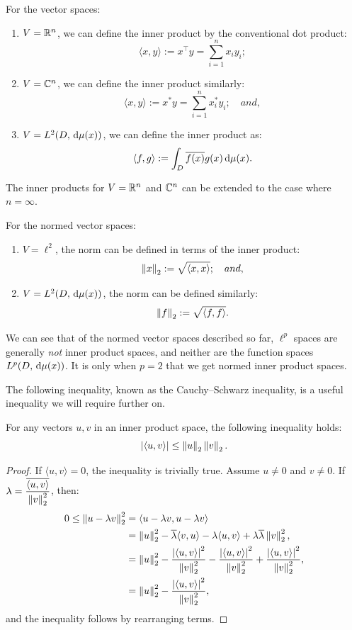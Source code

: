\begin{example}
For the vector spaces:
\begin{enumerate}
\item $V = \mathbb{R}^n$, we can define the inner product by the conventional dot product:
\[
\langle x,y \rangle := x^\top y = \sum_{i=1}^n x_iy_i;
\]
\item $V = \mathbb{C}^n$, we can define the inner product similarly:
\[
\langle x,y \rangle := x^* y = \sum_{i=1}^n x_i^*y_i;\quad and,
\]
\item $V = L^2(D,{\rm\,d}\mu(x))$, we can define the inner product as:
\[
\langle f,g\rangle := \int_D\overline{f(x)}g(x){\rm\,d}\mu(x).
\]
\end{enumerate}
\end{example}
The inner products for $V = \mathbb{R}^n$ and $\mathbb{C}^n$ can be extended to the case where $n=\infty$.

\begin{example} For the normed vector spaces:
\begin{enumerate}
\item $V = \ell^2$, the norm can be defined in terms of the inner product:
\[
\left\|{x}\right\|_2 := \sqrt{\langle x,x\rangle};\quad and,
\]
\item $V = L^2(D,{\rm\,d}\mu(x))$, the norm can be defined similarly:
\[
\left\|{f}\right\|_2 := \sqrt{\langle f,f\rangle}.
\]
\end{enumerate}
\end{example}

We can see that of the normed vector spaces described so far, $\ell^p$ spaces are generally {\em not} inner product spaces, and neither are the function spaces $L^p(D,{\rm\,d}\mu(x))$. It is only when $p=2$ that we get normed inner product spaces.

The following inequality, known as the Cauchy--Schwarz inequality, is a useful inequality we will require further on.
\begin{theorem}
For any vectors $u,v$ in an inner product space, the following inequality holds:
\begin{equation}
\left|{\langle u,v\rangle}\right| \le \left\|{u}\right\|_2\left\|{v}\right\|_2.
\end{equation}
\end{theorem}
\begin{proof}
If $\langle u,v\rangle =0$, the inequality is trivially true. Assume $u\ne 0$ and $v\ne 0$. If $\lambda = \dfrac{\overline{\langle u,v\rangle}}{\left\|{v}\right\|_2^2}$, then:
\begin{align*}
0 \le \left\|{u-\lambda v}\right\|_2^2 & = \langle u-\lambda v,u-\lambda v\rangle\\
& = \left\|{u}\right\|_2^2 -\overline{\lambda}\langle v,u\rangle - \lambda\langle u,v\rangle +\lambda\overline{\lambda}\left\|{v}\right\|_2^2,\\
& = \left\|{u}\right\|_2^2 -\dfrac{\left|{\langle u,v\rangle}\right|^2}{\left\|{v}\right\|_2^2} - \dfrac{\left|{\langle u,v\rangle}\right|^2}{\left\|{v}\right\|_2^2} +\dfrac{\left|{\langle u,v\rangle}\right|^2}{\left\|{v}\right\|_2^2},\\
& = \left\|{u}\right\|_2^2 -\dfrac{\left|{\langle u,v\rangle}\right|^2}{\left\|{v}\right\|_2^2},
\end{align*}
and the inequality follows by rearranging terms.
\end{proof}

